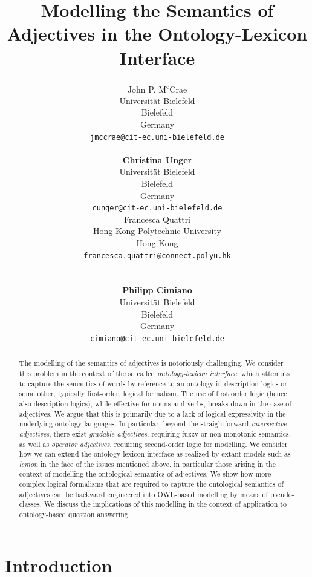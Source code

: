 \documentclass[11pt]{article}
\title{Modelling the Semantics of Adjectives in the Ontology-Lexicon Interface}
\author{John P. M\textsuperscript{c}Crae\\
  Universit\"at Bielefeld \\
  Bielefeld\\
  Germany \\
  {\tt \footnotesize jmccrae@cit-ec.uni-bielefeld.de} \\ \\
	{\bf Christina Unger} \\
	Universit\"at Bielefeld \\
  Bielefeld\\
  Germany \\
  {\tt \footnotesize cunger@cit-ec.uni-bielefeld.de}\\
 \And
  Francesca Quattri\\
  Hong Kong Polytechnic University \\
 Hong Kong \\
  {\tt \footnotesize francesca.quattri@connect.polyu.hk} \\ \\ \\
  {\bf Philipp Cimiano} \\
  Universit\"at Bielefeld \\
  Bielefeld\\
  Germany \\
  {\tt \footnotesize cimiano@cit-ec.uni-bielefeld.de}}
\date{}
\begin{document}
\maketitle
\begin{abstract}
The modelling of the semantics of adjectives is notoriously challenging. We consider this problem in the context of the so called \emph{ontology-lexicon interface}, which attempts to capture the semantics of words by reference to an ontology in description logics or some other, typically first-order, logical formalism.
The use of first order logic (hence also description logics),
while effective for nouns and verbs, breaks down in the case of adjectives. 
We argue that this is primarily due to a lack of logical expressivity in the 
underlying ontology languages. In particular, beyond the straightforward \emph{intersective adjectives}, there exist \emph{gradable adjectives}, requiring fuzzy or
non-monotonic semantics, as well as \emph{operator adjectives}, requiring second-order logic for modelling. 
We consider how we can extend the ontology-lexicon interface as realized by extant models such as \emph{lemon} in the face of the issues mentioned above, in particular those arising in the context of modelling the ontological semantics of adjectives. We show how more complex logical formalisms that are required to capture the ontological semantics of adjectives can be backward 
engineered into OWL-based modelling by means of pseudo-classes. We discuss the implications of this modelling in the context of application to ontology-based question answering.
\end{abstract}



\section{Introduction}
\label{intro}
\end{document}
